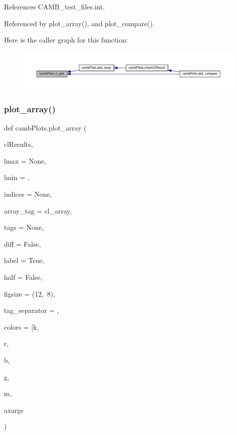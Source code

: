 References C\+A\+M\+B\+\_\+test\+\_\+files.\+int.



Referenced by plot\+\_\+array(), and plot\+\_\+compare().

Here is the caller graph for this function\+:
\nopagebreak
\begin{figure}[H]
\begin{center}
\leavevmode
\includegraphics[width=350pt]{namespacecambPlots_acbf66894e403d2b8926fa5a598fb204d_icgraph}
\end{center}
\end{figure}
\mbox{\label{namespacecambPlots_a0929c1777ebbcf7b4f020b63ec6ce36f}} 
\subsubsection{\texorpdfstring{plot\+\_\+array()}{plot\_array()}}
{\footnotesize\ttfamily def camb\+Plots.\+plot\+\_\+array (\begin{DoxyParamCaption}\item[{}]{cl\+Results,  }\item[{}]{lmax = {\ttfamily None},  }\item[{}]{lmin = {},  }\item[{}]{indices = {\ttfamily None},  }\item[{}]{array\+\_\+tag = {\ttfamily \textquotesingle{}cl\+\_\+array\textquotesingle{}},  }\item[{}]{tags = {\ttfamily None},  }\item[{}]{diff = {\ttfamily False},  }\item[{}]{label = {\ttfamily True},  }\item[{}]{half = {\ttfamily False},  }\item[{}]{figsize = {\ttfamily (12,~8)},  }\item[{}]{tag\+\_\+separator = {\ttfamily \textquotesingle{}\textquotesingle{}},  }\item[{}]{colors = {\ttfamily \mbox{[}\textquotesingle{}k\textquotesingle{}},  }\item[{}]{r,  }\item[{}]{b,  }\item[{}]{g,  }\item[{}]{m,  }\item[{}]{axargs }\end{DoxyParamCaption})}



